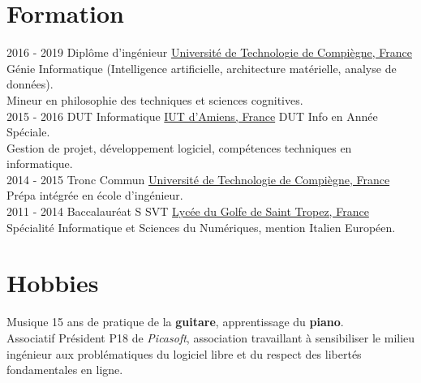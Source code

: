 \documentclass[letterpaper]{twentysecondcv} %
\begin{document}
\section{Formation}

\begin{twenty} %
	\twentyitem
    	{2016 - 2019}
        {}
        {Diplôme d'ingénieur}
        {\href{https://www.utc.fr/}{Université de Technologie de Compiègne, France}}
        {}
        {Génie Informatique (Intelligence artificielle, architecture matérielle, analyse de données).\\Mineur en philosophie des techniques et sciences cognitives.}
    \\
	\twentyitem
    	{2015 - 2016}
        {}
        {DUT Informatique}
        {\href{http://www.iut-amiens.fr/}{IUT d'Amiens, France}}
        {}
        {DUT Info en Année Spéciale.\\Gestion de projet, développement logiciel, compétences techniques en informatique.}
    \\
	\twentyitem
    	{2014 - 2015}
        {}
        {Tronc Commun}
        {\href{https://www.utc.fr/}{Université de Technologie de Compiègne, France}}
        {}
        {Prépa intégrée en école d'ingénieur.}
    \\
	\twentyitem
    	{2011 - 2014}
		{}
        {Baccalauréat S SVT}
        {\href{http://www.lyc-du-golfe-de-saint-tropez.ac-nice.fr/}{Lycée du Golfe de Saint Tropez, France}}
        {}
        {Spécialité Informatique et Sciences du Numériques, mention Italien Européen.}
\end{twenty}


\section{Hobbies}
\begin{twenty}
	\twentyitem
    	{}
		{}
        {Musique}
        {}
        {}
        {15 ans de pratique de la \textbf{guitare}, apprentissage du \textbf{piano}.}
    \\
    \twentyitem
    	{}
		{}
        {Associatif}
        {}
        {}
        {Président P18 de \textit{Picasoft}, association travaillant à sensibiliser le milieu ingénieur aux problématiques du logiciel libre et du respect des libertés fondamentales en ligne.}
\end{twenty}
\end{document}
